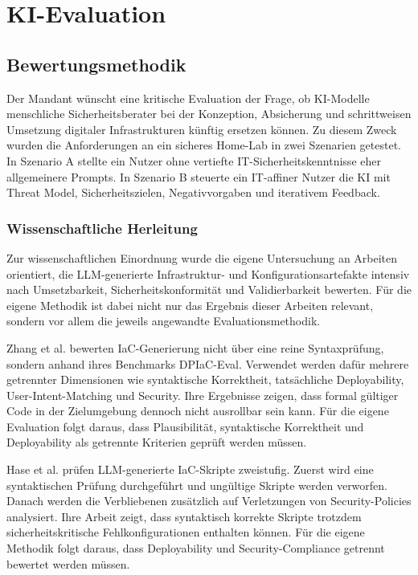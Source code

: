 \chapter{\acs{KI}-Evaluation}

\section{Bewertungsmethodik}

Der Mandant wünscht eine kritische Evaluation der Frage, ob \ac{KI}-Modelle menschliche Sicherheitsberater bei der Konzeption, Absicherung und schrittweisen Umsetzung digitaler Infrastrukturen künftig ersetzen können. Zu diesem Zweck wurden die Anforderungen an ein sicheres Home-Lab in zwei Szenarien getestet. 
In Szenario A stellte ein Nutzer ohne vertiefte IT-Sicherheitskenntnisse eher allgemeinere Prompts. 
In Szenario B steuerte ein IT-affiner Nutzer die \acs{KI} mit Threat Model, Sicherheitszielen, Negativvorgaben und iterativem Feedback.

\subsection{Wissenschaftliche Herleitung}

Zur wissenschaftlichen Einordnung wurde die eigene Untersuchung an Arbeiten orientiert, die \acs{LLM}-generierte Infrastruktur- und Konfigurationsartefakte intensiv nach Umsetzbarkeit, Sicherheitskonformität und Validierbarkeit bewerten. 
Für die eigene Methodik ist dabei nicht nur das Ergebnis dieser Arbeiten relevant, sondern vor allem die jeweils angewandte Evaluationsmethodik.

Zhang et al. bewerten \ac{IaC}-Generierung nicht über eine reine Syntaxprüfung, sondern anhand ihres Benchmarks DPIaC-Eval. Verwendet werden dafür mehrere getrennter Dimensionen wie syntaktische Korrektheit, tatsächliche Deployability, User-Intent-Matching und Security. 
Ihre Ergebnisse zeigen, dass formal gültiger Code in der Zielumgebung dennoch nicht ausrollbar sein kann. Für die eigene Evaluation folgt daraus, dass Plausibilität, syntaktische Korrektheit und Deployability als getrennte Kriterien geprüft werden müssen.\cite{zhang2025deployabilitycentriciac}

Hase et al. prüfen \acs{LLM}-generierte \acs{IaC}-Skripte zweistufig.
Zuerst wird eine syntaktischen Prüfung durchgeführt und ungültige Skripte werden verworfen. 
Danach werden die Verbliebenen zusätzlich auf Verletzungen von Security-Policies analysiert. Ihre Arbeit zeigt, dass syntaktisch korrekte Skripte trotzdem sicherheitskritische Fehlkonfigurationen enthalten können. 
Für die eigene Methodik folgt daraus, dass Deployability und Security-Compliance getrennt bewertet werden müssen.\cite{KISecurityPolicies}

